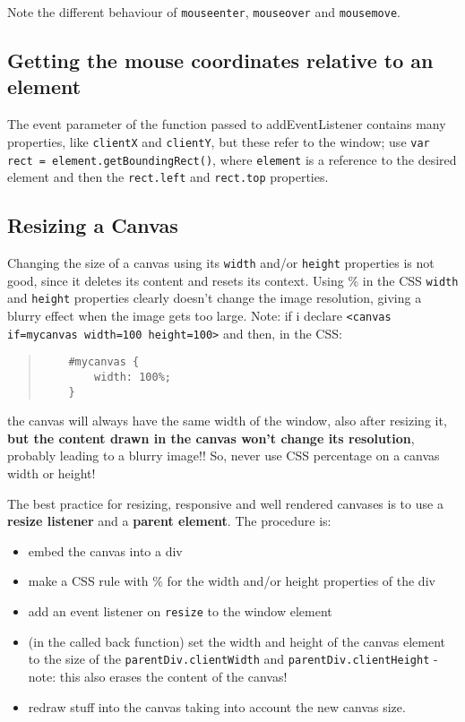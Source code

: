 \documentclass[a4paper,11pt]{book}
\begin{document}
Note the different behaviour of \texttt{mouseenter}, \texttt{mouseover} and
\texttt{mousemove}.

\subsection{Getting the mouse coordinates relative to an element}
The event parameter of the function passed to addEventListener contains many properties,
like \texttt{clientX} and \texttt{clientY}, but these refer to the window; use
\texttt{var rect = element.getBoundingRect()}, where \texttt{element} is a reference
to the desired element and then the \texttt{rect.left} and \texttt{rect.top} properties.

\subsection{Resizing a Canvas}
Changing the size of a canvas using its \texttt{width} and/or \texttt{height} properties
is not good, since it deletes its content and resets its context. Using \% in the CSS
\texttt{width} and \texttt{height} properties clearly doesn't change the image resolution,
giving a blurry effect when the image gets too large.
Note: if i declare \texttt{<canvas if=mycanvas width=100 height=100>} and then, in the
CSS:
\begin{verse}
\begin{verbatim}
	#mycanvas {
		width: 100%;
	}
\end{verbatim}
\end{verse}
the canvas will always have the same width of the window, also after resizing it,
\textbf{but the content drawn in the canvas won't change its resolution}, probably
leading to a blurry image!! So, never use CSS percentage on a canvas width or height!

The best practice for resizing, responsive and well rendered canvases is to use
a \textbf{resize listener} and a \textbf{parent element}.
The procedure is:
\begin{itemize}
\item embed the canvas into a div
\item make a CSS rule with \% for the width and/or height properties of the div
\item add an event listener on \texttt{resize} to the window element
\item (in the called back function) set the width and height of the canvas element to the size
	of the \texttt{parentDiv.clientWidth} and \texttt{parentDiv.clientHeight} -
	note: this also erases the content of the canvas!
\item redraw stuff into the canvas taking into account the new canvas size.
\end{itemize}
\end{document}
